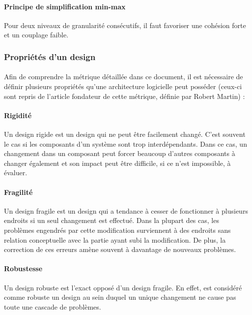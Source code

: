\documentclass{scrartcl}
\begin{document}
    \paragraph{Principe de simplification min-max}Pour deux niveaux de granularité consécutifs, il faut favoriser une cohésion forte et un couplage faible.

\subsubsection{Propriétés d'un design}

    \paragraph{}Afin de comprendre la métrique détaillée dans ce document, il est nécessaire de définir plusieurs propriétés qu'une architecture logicielle peut posséder (ceux-ci sont repris de l'article fondateur de cette métrique, définie par Robert Martin\cite{Martin:1994}) :

    \paragraph{Rigidité}Un design rigide est un design qui ne peut être facilement changé. C'est souvent le cas si les composants d'un système sont trop interdépendants. Dans ce cas, un changement dans un composant peut forcer beaucoup d'autres composants à changer également et son impact peut être difficile, si ce n'est impossible, à évaluer.

    \paragraph{Fragilité}Un design fragile est un design qui a tendance à cesser de fonctionner à plusieurs endroits si un seul changement est effectué. Dans la plupart des cas, les problèmes engendrés par cette modification surviennent à des endroits sans relation conceptuelle avec la partie ayant subi la modification. De plus, la correction de ces erreurs amène souvent à davantage de nouveaux problèmes.

    \paragraph{Robustesse}Un design robuste est l'exact opposé d'un design fragile. En effet, est considéré comme robuste un design au sein duquel un unique changement ne cause pas toute une cascade de problèmes.
\end{document}
